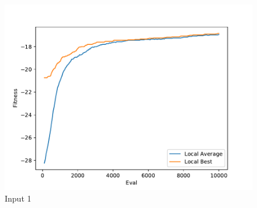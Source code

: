 \documentclass{standalone}
\begin{document}
\begin{figure}[!htb]
	\caption{Input 1}
	\label{fig:graph_1060}
	\includegraphics[width=\textwidth]{../graphs/graphs/1060.pdf}
\end{figure}
\end{document}
